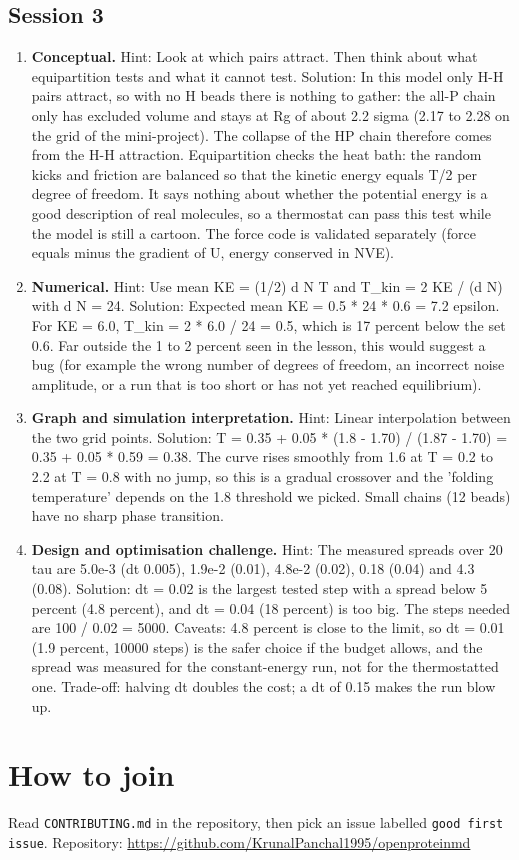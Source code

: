 \documentclass[11pt,a4paper]{article}
\begin{document}
\subsection*{Session 3}
\begin{enumerate}[nosep]
\item \textbf{Conceptual.} Hint: Look at which pairs attract. Then think about what equipartition tests and what it cannot test. Solution: In this model only H-H pairs attract, so with no H beads there is nothing to gather: the all-P chain only has excluded volume and stays at Rg of about 2.2 sigma (2.17 to 2.28 on the grid of the mini-project). The collapse of the HP chain therefore comes from the H-H attraction. Equipartition checks the heat bath: the random kicks and friction are balanced so that the kinetic energy equals T/2 per degree of freedom. It says nothing about whether the potential energy is a good description of real molecules, so a thermostat can pass this test while the model is still a cartoon. The force code is validated separately (force equals minus the gradient of U, energy conserved in NVE).
\item \textbf{Numerical.} Hint: Use mean KE = (1/2) d N T and T\_kin = 2 KE / (d N) with d N = 24. Solution: Expected mean KE = 0.5 * 24 * 0.6 = 7.2 epsilon. For KE = 6.0, T\_kin = 2 * 6.0 / 24 = 0.5, which is 17 percent below the set 0.6. Far outside the 1 to 2 percent seen in the lesson, this would suggest a bug (for example the wrong number of degrees of freedom, an incorrect noise amplitude, or a run that is too short or has not yet reached equilibrium).
\item \textbf{Graph and simulation interpretation.} Hint: Linear interpolation between the two grid points. Solution: T = 0.35 + 0.05 * (1.8 - 1.70) / (1.87 - 1.70) = 0.35 + 0.05 * 0.59 = 0.38. The curve rises smoothly from 1.6 at T = 0.2 to 2.2 at T = 0.8 with no jump, so this is a gradual crossover and the 'folding temperature' depends on the 1.8 threshold we picked. Small chains (12 beads) have no sharp phase transition.
\item \textbf{Design and optimisation challenge.} Hint: The measured spreads over 20 tau are 5.0e-3 (dt 0.005), 1.9e-2 (0.01), 4.8e-2 (0.02), 0.18 (0.04) and 4.3 (0.08). Solution: dt = 0.02 is the largest tested step with a spread below 5 percent (4.8 percent), and dt = 0.04 (18 percent) is too big. The steps needed are 100 / 0.02 = 5000. Caveats: 4.8 percent is close to the limit, so dt = 0.01 (1.9 percent, 10000 steps) is the safer choice if the budget allows, and the spread was measured for the constant-energy run, not for the thermostatted one. Trade-off: halving dt doubles the cost; a dt of 0.15 makes the run blow up.
\end{enumerate}

\section{How to join}
Read \texttt{CONTRIBUTING.md} in the repository, then pick an issue labelled \texttt{good first issue}. Repository: \url{https://github.com/KrunalPanchal1995/openproteinmd}
\end{document}
